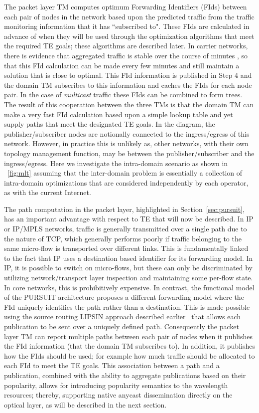 \documentclass[journal]{IEEEtran}
\begin{document}
The packet layer TM computes optimum Forwarding Identifiers (FIds)
between each pair of nodes in the network based upon the predicted
traffic from the traffic monitoring information that it has
``subscribed to". These FIds are calculated in advance of when they
will be used through the optimization algorithms that meet the
required TE goals; these algorithms are described later. In carrier networks, there is evidence that aggregated traffic is stable over the course of minutes \cite{Zha:te}, so that this FId calculation can be made every few minutes and still maintain a solution that is close to optimal. This FId information is published in Step 4 and the domain TM subscribes to this information and caches the FIds for each node pair. In the case of \emph{multicast} traffic these FIds can be combined to form trees. The result of this cooperation between the three TMs is that the domain TM can make a very fast FId calculation based upon a simple lookup table and yet supply paths that meet the designated TE goals. In the diagram, the publisher/subscriber nodes are notionally connected to the ingress/egress of this network. However, in practice this is unlikely as, other networks, with their own topology management function, may be between the publisher/subscriber and the ingress/egress. Here we investigate the intra-domain scenario as shown in \figurename~\ref{fig:mlt} assuming that the inter-domain problem is essentially a collection of intra-domain optimizations that are considered independently by each operator, as with the current Internet.

The path computation in the packet layer, highlighted in Section~\ref{sec:pursuit}, has an important advantage with respect to TE that will now be described. In IP or IP/MPLS networks, traffic is generally transmitted over a single path due to the nature of TCP, which generally performs poorly if traffic belonging to the same micro-flow is transported over different links. This is fundamentally linked to the fact that IP uses a destination based identifier for its forwarding model. In IP, it is possible to switch on micro-flows, but these can only be discriminated by utilizing network/transport layer inspection and maintaining some per-flow state. In core networks, this is prohibitively expensive. In contrast, the functional model of the PURSUIT architecture proposes a different forwarding model where the FId uniquely identifies the path rather than a destination.
This is made possible using the source routing LIPSIN approach
described earlier~\cite{pet:ICnet} that allows each publication to be
sent over a uniquely defined path. Consequently the packet layer TM
can report multiple paths between each pair of nodes when it publishes
the FId information (that the domain TM subscribes to). In addition,
it publishes how the FIds should be used; for example how much traffic
should be allocated to each FId to meet the TE goals. This association
between a path and a publication, combined with the ability to
aggregate publications based on their popularity, allows for
introducing popularity semantics to the wavelength resources; thereby,
supporting native anycast dissemination directly on the optical layer, as will be described in the next section.
\end{document}
